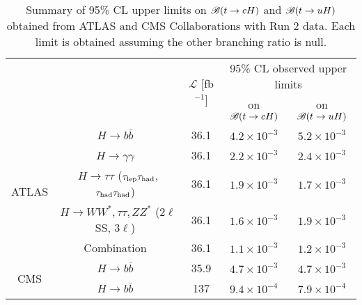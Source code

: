 \begin{table}[t!]
\caption{\small{Summary of 95\% CL upper limits on $\mathscr{B}(t \to cH)$ and $\mathscr{B}(t \to uH)$ obtained from ATLAS and CMS Collaborations with Run 2 data. Each limit is obtained assuming the other branching ratio is null.}}
\begin{center}
\small 
\begin{tabular}{ccccc}
\toprule\toprule
& &\multirow{2}{*}{$\mathcal{L}$ [fb$^{-1}$]} & \multicolumn{2}{c}{95\% CL observed upper limits}  \\
& & 										    & \multicolumn{1}{c}{on $\mathscr{B}(t \to cH)$}            & \multicolumn{1}{c}{on $\mathscr{B}(t \to uH)$} \\
\midrule
\multirow{5}{*}{ATLAS}
& $H \to b\bar{b}$~\cite{fcnc36}                                          & 36.1         & $4.2 \times 10^{-3}$ & $5.2 \times 10^{-3}$ \\
& $H \to \gamma\gamma$~\cite{Aaboud:2017mfd}                              & 36.1         & $2.2 \times 10^{-3}$  & $2.4 \times 10^{-3}$  \\
& $H \to \tau\tau$ ($\tau_{\mathrm{lep}} \tau_{\mathrm{had}}$, $\tau_{\mathrm{had}} \tau_{\mathrm{had}}$)~\cite{fcnc36}                   & 36.1         & $1.9 \times 10^{-3}$  & $1.7 \times 10^{-3}$  \\ 
& $H \to WW^*, \tau\tau, ZZ^*$ ($2\ell$SS, $3\ell$)~\cite{Aaboud:2018pob} & 36.1         & $1.6 \times 10^{-3}$  & $1.9 \times 10^{-3}$\\ 
& Combination~\cite{fcnc36}                                               & 36.1         & $1.1 \times 10^{-3}$  & $1.2 \times 10^{-3}$  \\\midrule
\multirow{2}{*}{CMS} 
& $H \to b\bar{b}$~\cite{Sirunyan:2017uae}                                & 35.9         & $4.7 \times 10^{-3}$  & $4.7 \times 10^{-3}$  \\
& $H \to b\bar{b}$~\cite{CMS:2021gfa}                                     & 137          & $9.4 \times 10^{-4}$  & $7.9 \times 10^{-4}$  \\
% 
\bottomrule\bottomrule
\end{tabular}
\label{tab:limits_summary_ref}
\end{center}
\end{table}




